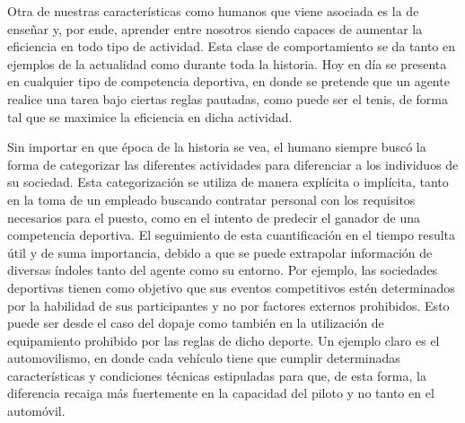 \documentclass[11pt,twoside,spanish]{report} %
\begin{document}
Otra de nuestras caracter\'isticas como humanos que viene asociada es la de ense\~nar y, por ende, aprender entre nosotros siendo capaces de aumentar la eficiencia en todo tipo de actividad.
Esta clase de comportamiento se da tanto en ejemplos de la actualidad como durante toda la historia. 
Hoy en d\'ia se presenta en cualquier tipo de competencia deportiva, en donde se pretende que un agente realice una tarea bajo ciertas reglas pautadas, como puede ser el tenis, de forma tal que se maximice la eficiencia en dicha actividad.

Sin importar en que \'epoca de la historia se vea, el humano siempre busc\'o la forma de categorizar las diferentes actividades para diferenciar a los individuos de su sociedad.
Esta categorizaci\'on se utiliza de manera expl\'icita o impl\'icita, tanto en la toma de un empleado buscando contratar personal con los requisitos necesarios para el puesto, como en el intento de predecir el ganador de una competencia deportiva.
El seguimiento de esta cuantificaci\'on en el tiempo resulta \'util y de suma importancia, debido a que se puede extrapolar informaci\'on de diversas \'indoles tanto del agente como su entorno.
Por ejemplo, las sociedades deportivas tienen como objetivo que sus eventos competitivos est\'en determinados por la habilidad de sus participantes y no por factores externos prohibidos.
Esto puede ser desde el caso del dopaje como tambi\'en en la utilizaci\'on de equipamiento prohibido por las reglas de dicho deporte.
Un ejemplo claro es el automovilismo, en donde cada veh\'iculo tiene que cumplir determinadas caracter\'isticas y condiciones t\'ecnicas estipuladas para que, de esta forma, la diferencia recaiga m\'as fuertemente en la capacidad del piloto y no tanto en el autom\'ovil.
\end{document}
